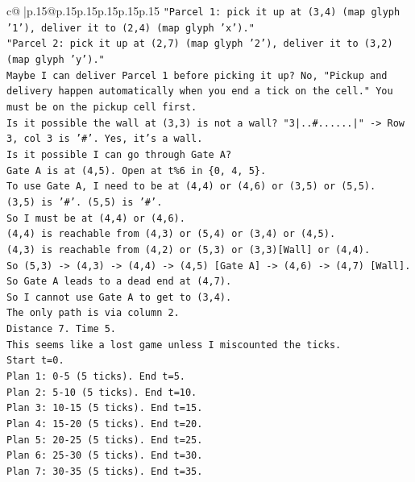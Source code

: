 \documentclass{article}
\begin{document}
{\begin{supertabular}{c@{$\;$}|p{.15\linewidth}@{}p{.15\linewidth}p{.15\linewidth}p{.15\linewidth}p{.15\linewidth}p{.15\linewidth}}
{{{\texttt{"Parcel 1: pick it up at (3,4) (map glyph '1'), deliver it to (2,4) (map glyph 'x')."} \\
\texttt{"Parcel 2: pick it up at (2,7) (map glyph '2'), deliver it to (3,2) (map glyph 'y')."} \\
\texttt{Maybe I can deliver Parcel 1 before picking it up? No, "Pickup and delivery happen automatically when you end a tick on the cell." You must be on the pickup cell first.} \\
\texttt{Is it possible the wall at (3,3) is not a wall? "3|..\#......|" {-}> Row 3, col 3 is '\#'. Yes, it's a wall.} \\
\texttt{Is it possible I can go through Gate A?} \\
\texttt{Gate A is at (4,5). Open at t\%6 in \{0, 4, 5\}.} \\
\texttt{To use Gate A, I need to be at (4,4) or (4,6) or (3,5) or (5,5).} \\
\texttt{(3,5) is '\#'. (5,5) is '\#'.} \\
\texttt{So I must be at (4,4) or (4,6).} \\
\texttt{(4,4) is reachable from (4,3) or (5,4) or (3,4) or (4,5).} \\
\texttt{(4,3) is reachable from (4,2) or (5,3) or (3,3){[}Wall{]} or (4,4).} \\
\texttt{So (5,3) {-}> (4,3) {-}> (4,4) {-}> (4,5) {[}Gate A{]} {-}> (4,6) {-}> (4,7) {[}Wall{]}.} \\
\texttt{So Gate A leads to a dead end at (4,7).} \\
\texttt{So I cannot use Gate A to get to (3,4).} \\
\texttt{The only path is via column 2.} \\
\texttt{Distance 7. Time 5.} \\
\texttt{This seems like a lost game unless I miscounted the ticks.} \\
\texttt{Start t=0.} \\
\texttt{Plan 1: 0{-}5 (5 ticks). End t=5.} \\
\texttt{Plan 2: 5{-}10 (5 ticks). End t=10.} \\
\texttt{Plan 3: 10{-}15 (5 ticks). End t=15.} \\
\texttt{Plan 4: 15{-}20 (5 ticks). End t=20.} \\
\texttt{Plan 5: 20{-}25 (5 ticks). End t=25.} \\
\texttt{Plan 6: 25{-}30 (5 ticks). End t=30.} \\
\texttt{Plan 7: 30{-}35 (5 ticks). End t=35.} \\
}}}
\end{supertabular}}
\end{document}
